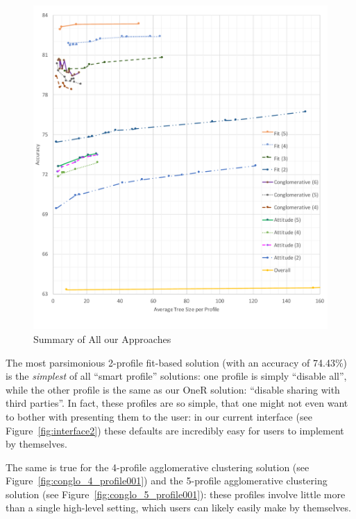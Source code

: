 \begin{figure}
	\centering
	\includegraphics[width=\textwidth]{figures/summaryAll.pdf}
	\caption{Summary of All our Approaches}
	\label{fig:summary}
\end{figure}

The most parsimonious 2-profile fit-based solution (with an accuracy of 74.43\%) is the \emph{simplest} of all ``smart profile'' solutions: one profile is simply ``disable all'', while the other profile is the same as our OneR solution: ``disable sharing with third parties''. In fact, these profiles are so simple, that one might not even want to bother with presenting them to the user: in our current interface (see Figure~\ref{fig:interface2}) these defaults are incredibly easy for users to implement by themselves.

The same is true for the 4-profile agglomerative clustering solution (see Figure~\ref{fig:conglo_4_profile001}) and the 5-profile agglomerative clustering solution (see Figure~\ref{fig:conglo_5_profile001}): these profiles involve little more than a single high-level setting, which users can likely easily make by themselves. 

